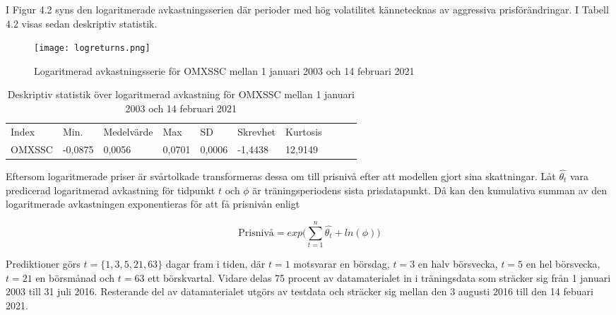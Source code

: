 \documentclass[11pt]{article}
\numberwithin{equation}{section}
\numberwithin{table}{section}
\numberwithin{figure}{section}
\begin{document}
\begin{table}[H]
\caption{Deskprivtiv statistik över stängningspriser för OMXSSC mellan 1 januari 2003 och 14 februari 2021}
\end{table}

I Figur 4.2 syns den logaritmerade avkastningsserien där perioder med hög volatilitet kännetecknas av aggressiva prisförändringar. I Tabell 4.2 visas sedan deskriptiv statistik. 

\begin{figure}[H]
\caption{Logaritmerad avkastningsserie för OMXSSC mellan 1 januari 2003 och 14 februari 2021}
\texttt{[image: logreturns.png]}
\centering
\end{figure}


\begin{table}[H]
\caption{Deskriptiv statistik över logaritmerad avkastning för OMXSSC mellan 1 januari 2003 och 14 februari 2021}
\begin{tabular}{@{}llllllllll@{}}
\cmidrule(r){1-7}
%
Index  & Min.    & Medelvärde & Max    & SD     & Skrevhet & Kurtosis \\ \cmidrule(r){1-7}
OMXSSC & -0,0875 & 0,0056     & 0,0701 & 0,0006 & -1,4438  & 12,9149  \\ \cmidrule(r){1-7}
\end{tabular}
\end{table}

Eftersom logaritmerade priser är svårtolkade transformeras dessa om till prisnivå efter att modellen gjort sina skattningar. Låt $\hat{\theta_t}$ vara predicerad logaritmerad avkastning för tidpunkt $t$ och $\phi$ är träningsperiodens sista prisdatapunkt. Då kan den kumulativa summan av den logaritmerade avkastningen exponentieras för att få prisnivån enligt

\begin{equation}
    \text{Prisnivå} =  exp\Big({\sum\limits_{t=1}^n \hat{\theta_{t}}} + ln(\phi)\Big)
\end{equation}

Prediktioner görs $t=\{1, 3, 5, 21, 63\}$ dagar fram i tiden, där $t=1$ motsvarar en börsdag,  $t=3$ en halv börsvecka, $t=5$ en hel börsvecka, $t=21$ en börsmånad och $t=63$ ett börskvartal. Vidare delas 75 procent av datamaterialet in i träningsdata som sträcker sig från 1 januari 2003 till 31 juli 2016. Resterande del av datamaterialet utgörs av testdata och sträcker sig mellan den 3 augusti 2016 till den 14 febuari 2021. 
\end{document}
